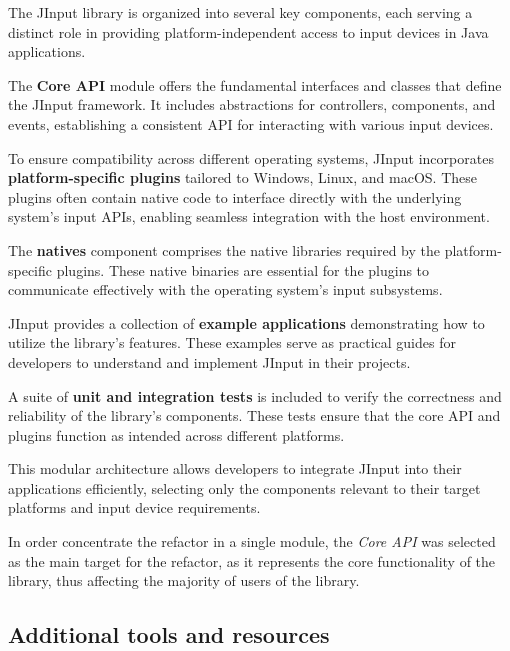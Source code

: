 
The JInput library is organized into several key components, each serving a distinct role in providing platform-independent access to input devices in Java applications.

The \textbf{Core API} module offers the fundamental interfaces and classes that define the JInput framework. It includes abstractions for controllers, components, and events, establishing a consistent API for interacting with various input devices.

To ensure compatibility across different operating systems, JInput incorporates \textbf{platform-specific plugins} tailored to Windows, Linux, and macOS. These plugins often contain native code to interface directly with the underlying system's input APIs, enabling seamless integration with the host environment.

The \textbf{natives} component comprises the native libraries required by the platform-specific plugins. These native binaries are essential for the plugins to communicate effectively with the operating system's input subsystems.

JInput provides a collection of \textbf{example applications} demonstrating how to utilize the library's features. These examples serve as practical guides for developers to understand and implement JInput in their projects.

A suite of \textbf{unit and integration tests} is included to verify the correctness and reliability of the library's components. These tests ensure that the core API and plugins function as intended across different platforms.

This modular architecture allows developers to integrate JInput into their applications efficiently, selecting only the components relevant to their target platforms and input device requirements.


In order concentrate the refactor in a single module, the \emph{Core API} was selected as the main target for the refactor, as it represents the core functionality of the library, thus affecting the majority of users of the library.

\subsection{Additional tools and resources}

